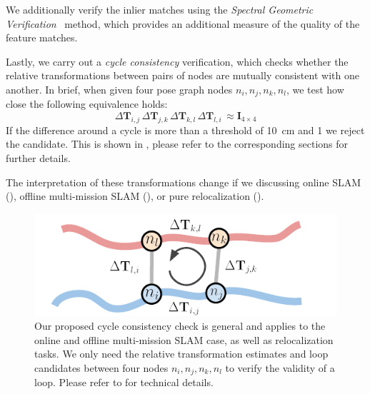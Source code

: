 
We additionally verify the inlier matches using the \emph{Spectral Geometric Verification}~\cite{vidanapathirana2023ral} method, which provides an additional measure of the quality of the feature matches.

Lastly, we carry out a \emph{cycle consistency} verification, which checks whether the relative transformations between pairs of nodes are mutually consistent with one another. In brief, when given four pose graph nodes $n_i, n_j, n_k, n_l$, we test how close the following equivalence holds:
\begin{equation}
\Delta\mathbf{T}_{i,j}\, \Delta\mathbf{T}_{j,k}\, \Delta\mathbf{T}_{k,l}\, \Delta\mathbf{T}_{l,i}\, \approx \mathbf{I}_{4\times4} 
\end{equation}
If the difference around a cycle is more than a threshold of \SI{10}{\centi\meter} and \SI{1}{\degrees} we reject the candidate. This is shown in , please refer to the corresponding sections for further details.

The interpretation of these transformations change if we discussing online SLAM (), offline multi-mission SLAM (), or pure relocalization (). 

\begin{figure}[t]
  \centering
  \includegraphics*[width=\columnwidth]{pics/methods_pairwise_consistency.pdf}
  \caption{Our proposed cycle consistency check is general and applies to the online and offline multi-mission SLAM case, as well as relocalization tasks. We only need the relative transformation estimates and loop candidates between four nodes $n_i, n_j, n_k, n_l$ to verify the validity of a loop. Please refer to  for technical details.}
  \label{fig:cycle-consistency}
\end{figure}

